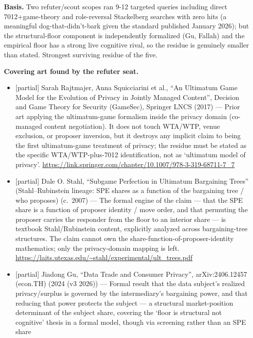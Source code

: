 \documentclass[
  11pt,
]{article}
\providecommand{\tightlist}{%
  \setlength{\itemsep}{0pt}\setlength{\parskip}{0pt}}
\begin{document}
\textbf{Basis.} Two refuter/scout scopes ran 9-12 targeted queries
including direct 7012+game-theory and role-reversal Stackelberg searches
with zero hits (a meaningful dog-that-didn't-bark given the standard
published January 2026); but the structural-floor component is
independently formalized (Gu, Fallah) and the empirical floor has a
strong live cognitive rival, so the residue is genuinely smaller than
stated. Strongest surviving residue of the five.

\textbf{Covering art found by the refuter seat.}

\begin{itemize}
\tightlist
\item
  {[}partial{]} Sarah Rajtmajer, Anna Squicciarini et al., ``An
  Ultimatum Game Model for the Evolution of Privacy in Jointly Managed
  Content'', Decision and Game Theory for Security (GameSec), Springer
  LNCS (2017) --- Prior art applying the ultimatum-game formalism inside
  the privacy domain (co-managed content negotiation). It does not touch
  WTA/WTP, venue exclusion, or proposer inversion, but it destroys any
  implicit claim to being the first ultimatum-game treatment of privacy;
  the residue must be stated as the specific WTA/WTP-plus-7012
  identification, not as `ultimatum model of privacy'.
  \url{https://link.springer.com/chapter/10.1007/978-3-319-68711-7_7}
\item
  {[}partial{]} Dale O. Stahl, ``Subgame Perfection in Ultimatum
  Bargaining Trees'' (Stahl--Rubinstein lineage: SPE shares as a
  function of the bargaining tree / who proposes) (c.~2007) --- The
  formal engine of the claim --- that the SPE share is a function of
  proposer identity / move order, and that permuting the proposer
  carries the responder from the floor to an interior share --- is
  textbook Stahl/Rubinstein content, explicitly analyzed across
  bargaining-tree structures. The claim cannot own the
  share-function-of-proposer-identity mathematics; only the
  privacy-domain mapping is left.
  \url{https://laits.utexas.edu/~stahl/experimental/ult_trees.pdf}
\item
  {[}partial{]} Jiadong Gu, ``Data Trade and Consumer Privacy'',
  arXiv:2406.12457 (econ.TH) (2024 (v3 2026)) --- Formal result that the
  data subject's realized privacy/surplus is governed by the
  intermediary's bargaining power, and that reducing that power protects
  the subject --- a structural market-position determinant of the
  subject share, covering the `floor is structural not cognitive' thesis
  in a formal model, though via screening rather than an SPE share

\end{itemize}
\end{document}
